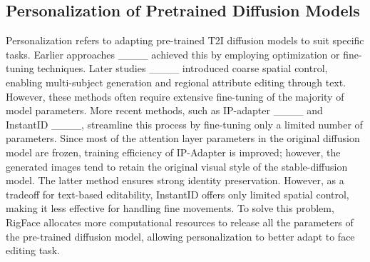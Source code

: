\subsection{Personalization of Pretrained Diffusion Models}
Personalization refers to adapting pre-trained T2I diffusion models to suit specific tasks. Earlier approaches ____ achieved this by employing optimization or fine-tuning techniques. Later studies ____ introduced coarse spatial control, enabling multi-subject generation and regional attribute editing through text. However, these methods often require extensive fine-tuning of the majority of model parameters. More recent methods, such as IP-adapter ____ and InstantID ____, streamline this process by fine-tuning only a limited number of parameters. Since most of the attention layer parameters in the original diffusion model are frozen, training efficiency of IP-Adapter is improved; however, the generated images tend to retain the original visual style of the stable-diffusion model. The latter method ensures strong identity preservation. However, as a tradeoff for text-based editability, InstantID offers only limited spatial control, making it less effective for handling fine movements. To solve this problem, RigFace allocates more computational resources to release all the parameters of the pre-trained diffusion model, allowing personalization to better adapt to face editing task.